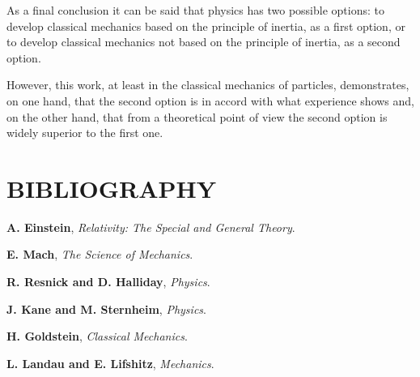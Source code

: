 \documentclass[12pt]{article}
\newcommand{\yT}{\bigskip}%
\newcommand{\cA}{\centering}%
\newcommand{\cT}{\cA\section}%
\newcommand{\ct}[1]{}%
\begin{document}
\par As a final conclusion it can be said that physics has two possible options: to develop classical mechanics based on the principle of inertia, as a first option, or to develop classical mechanics not based on the principle of inertia, as a second option.
\par However, this work, at least in the classical mechanics of particles, demonstrates, on one hand, that the second option is in accord with what experience shows and, on the other hand, that from a theoretical point of view the second option is widely superior to the first one.

\yT \vspace{-1.5em}

{\ct{BIBLIOGRAPHY}}
{\cT{BIBLIOGRAPHY}}

\par \textbf{A. Einstein}, \textit{Relativity: The Special and General Theory}.
\bigskip
\par \textbf{E. Mach}, \textit{The Science of Mechanics}.
\bigskip
\par \textbf{R. Resnick and D. Halliday}, \textit{Physics}.
\bigskip
\par \textbf{J. Kane and M. Sternheim}, \textit{Physics}.
\bigskip
\par \textbf{H. Goldstein}, \textit{Classical Mechanics}.
\bigskip
\par \textbf{L. Landau and E. Lifshitz}, \textit{Mechanics}.
\end{document}
